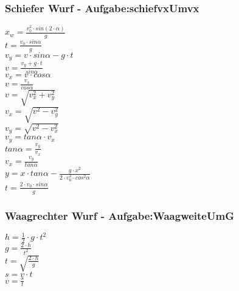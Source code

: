 \subsubsection{Schiefer Wurf  - Aufgabe:schiefvxUmvx} 
\begin{minipage}{0.45\textwidth} 
$ x_{w}  = \frac{v_{0} ^{2} \cdot sin(2\cdot \alpha )}{       g} $\\ 
$ t =\frac{v_{0} \cdot sin \alpha }{  g} $\\ 
$ v_{y}  =  v\cdot sin\alpha - g\cdot t $\\ 
$ v= \frac{ v_{y} +g\cdot t}{ sin\alpha } $\\ 
$ v_{x}  = v\cdot  cos\alpha $\\ 
$ v= \frac{ v_{x} }{ cos\alpha } $\\ 
$ v= \sqrt{ v_{x} ^{2} + v_{y} ^{2} } $\\ 
$ v_{x} = \sqrt{ v^{2}  - v_{y} ^{2} } $\\ 
$ v_{y} = \sqrt{ v^{2}  - v_{x} ^{2} } $\\ 
$ v_{y} = tan \alpha \cdot  v_{x} $\\ 
$ tan \alpha = \frac{v_{y} }{v_{x} } $\\ 
$ v_{x} = \frac{v_{y} }{tan \alpha } $\\ 
$ y = x\cdot tan \alpha  - \frac{   g\cdot x^{2} }{2\cdot v^{2} _{0} \cdot cos ^{2}\alpha } $\\ 
$ t =\frac{2\cdot v_{0} \cdot sin \alpha }{ g} $\\ 
\end{minipage} 
\begin{minipage}{0.45\textwidth} 
 
\end{minipage} 
\subsubsection{Waagrechter Wurf - Aufgabe:WaagweiteUmG} 
\begin{minipage}{0.45\textwidth} 
$ h = \frac{1}{2}\cdot g\cdot t^{2} $\\ 
$ g = \frac{2\cdot h}{t^{2} } $\\ 
$ t = \sqrt{\frac{2\cdot h}{g}} $\\ 
$ s = v\cdot t $\\ 
$ v = \frac{s}{t} $\\ 
\end{minipage} 
\begin{minipage}{0.45\textwidth} 
 
\end{minipage} 
